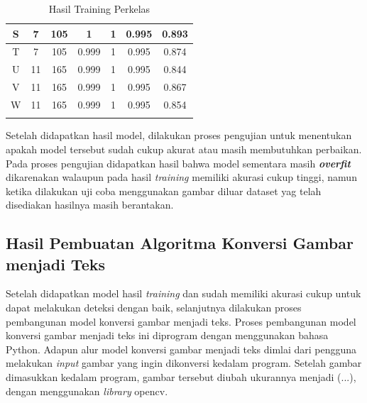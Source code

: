 \begin{center}
\begin{longtable}[c]{|c|c|c|c|c|c|c|}
    S              & 7                          & 105                   & 1          & 1          & 0.995            & 0.893                 \\ \hline
    T              & 7                          & 105                   & 0.999      & 1          & 0.995            & 0.874                 \\ \hline
    U              & 11                         & 165                   & 0.999      & 1          & 0.995            & 0.844                 \\ \hline
    V              & 11                         & 165                   & 0.999      & 1          & 0.995            & 0.867                 \\ \hline
    W              & 11                         & 165                   & 0.999      & 1          & 0.995            & 0.854                 \\ \hline
    \caption{Hasil Training Perkelas}
    \label{tb:trainperkelas}
  \end{longtable}
\end{center}

Setelah didapatkan hasil model, dilakukan proses pengujian untuk menentukan apakah model tersebut sudah cukup akurat atau masih membutuhkan perbaikan. Pada proses pengujian didapatkan hasil bahwa model 
sementara masih \textit{\textbf{overfit}} dikarenakan walaupun pada hasil \textit{training} memiliki akurasi cukup tinggi, namun ketika dilakukan uji coba menggunakan gambar diluar dataset yag telah disediakan hasilnya masih berantakan. \par


\subsection{Hasil Pembuatan Algoritma Konversi Gambar menjadi Teks}
\label{subsec:hasilmembangunmodel}

Setelah didapatkan model hasil \textit{training} dan sudah memiliki akurasi cukup untuk dapat melakukan deteksi dengan baik, selanjutnya dilakukan proses pembangunan model konversi gambar menjadi teks. Proses pembangunan model konversi gambar menjadi teks ini diprogram dengan menggunakan bahasa Python. Adapun alur model konversi gambar menjadi teks dimlai dari pengguna melakukan \textit{input} gambar yang ingin dikonversi kedalam program. Setelah gambar dimasukkan kedalam program, gambar tersebut diubah ukurannya menjadi (...), dengan menggunakan \textit{library} opencv. \par

